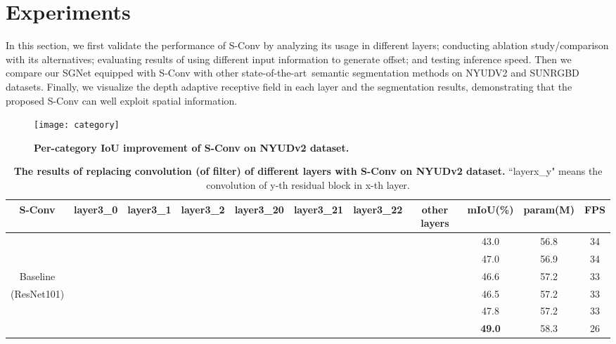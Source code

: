 \documentclass[journal]{IEEEtran}
\def\sArt{{state-of-the-art~}}
\begin{document}
\section{Experiments}
\label{sec:experiments}
 In this section, we first validate the performance of S-Conv by analyzing its usage in 
different layers; conducting ablation study/comparison with its alternatives; 
evaluating results of using different input information
to generate offset; and testing inference speed.
Then we compare our SGNet equipped with S-Conv with other \sArt semantic segmentation methods
on NYUDV2 and SUNRGBD datasets.
Finally, we visualize the depth adaptive receptive field in each layer 
and the segmentation results, demonstrating that the proposed S-Conv can well exploit spatial information.
\begin{figure*}[t]
\centering
	\texttt{[image: category]}\\
	\vspace{-15pt}
	\caption{\textbf{Per-category IoU improvement of S-Conv on NYUDv2 dataset.}}
	\label{fig:catgory}
\end{figure*}

\begin{table*}[t]\normalsize
	\centering
	\caption{\textbf{The results of replacing convolution (of  filter)
			of different layers with S-Conv on NYUDv2 dataset.}
		``layerx\_y" means the  convolution of y-th residual block 
		in x-th layer. 
	}\label{tab:ablation1} \vspace{-6pt}
	\renewcommand\tabcolsep{4pt}
	\begin{tabular}{c ||c c c c c c c |c  c c}\toprule[1.5pt]		
		S-Conv & layer3\_0 & layer3\_1 & layer3\_2 & layer3\_20 & layer3\_21 & layer3\_22 & other layers & mIoU(\%) &param(M)&FPS\\ \hline \hline
		&           &          &          &          &          &          &          &43.0         &56.8&34\\
		&\checkmark &          &          &          &          &          &          &47.0         &56.9&34\\
		Baseline           &\checkmark &\checkmark&\checkmark&          &          &          &          &46.6        &57.2&33\\
		(ResNet101)        &           &          &          &\checkmark&\checkmark&\checkmark&          &46.5         &57.2&33\\
		&\checkmark &          &          &          &\checkmark&\checkmark&          &47.8         &57.2&33\\
		&\checkmark &          &          &          &\checkmark&\checkmark&\checkmark&\textbf{49.0}&58.3&26\\
		\bottomrule[1.5pt]
	\end{tabular}
\end{table*}
\end{document}
